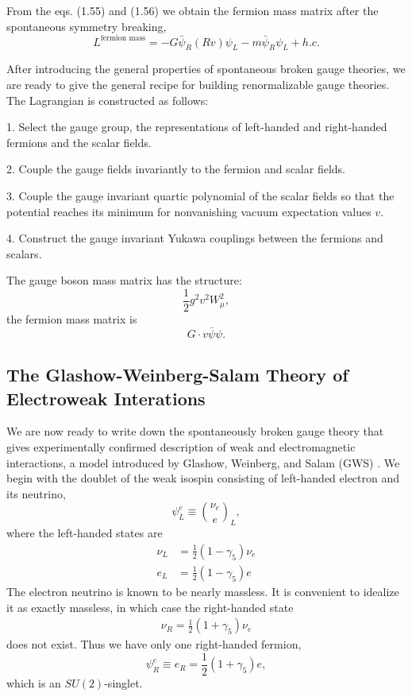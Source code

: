From the eqs. (1.55) and (1.56) we obtain the fermion mass matrix after the spontaneous symmetry breaking,
\begin{equation}
L^{\text{fermion mass}}=-G\bar{\psi}_R(Rv)\psi_L-m\bar{\psi}_R\psi_L+h.c.
\end{equation}

After introducing the general properties of spontaneous broken gauge theories, we are ready to give the general recipe for building renormalizable gauge theories. The Lagrangian is constructed as follows:

1. Select the gauge group, the representations of left-handed and right-handed fermions and the scalar fields.

2. Couple the gauge fields invariantly to the fermion and scalar fields.

3. Couple the gauge invariant quartic polynomial of the scalar fields so that the potential reaches its minimum for nonvanishing vacuum expectation values $v$.

4. Construct the gauge invariant Yukawa couplings between the fermions and scalars.

The gauge boson mass matrix has the structure: 
$$
\frac{1}{2}g^2v^2W_\mu^2,
$$
the fermion mass matrix is
$$
G\cdot v\bar{\psi}\psi.
$$

\subsection{The Glashow-Weinberg-Salam Theory of Electroweak Interations}
We are now ready to write down the spontaneously broken gauge theory that gives experimentally confirmed description of weak and electromagnetic interactions, a model introduced by Glashow, Weinberg, and Salam (GWS) \cite{Glashow1961,Weinberg,Salam}. We begin with the doublet of the weak isospin consisting of left-handed electron and its neutrino,
\begin{equation}
\psi_{L}^e \equiv \binom{\nu_e}{e}_L,
\end{equation}
where the left-handed states are
\begin{align}
\nu_L&=\frac{1}{2}(1-\gamma_5)\nu_e\nonumber\\
e_L&=\frac{1}{2}(1-\gamma_5)e
\end{align}
The electron neutrino is known to be nearly massless. It is convenient to idealize it as exactly massless, in which case the right-handed state 
\begin{eqnarray}
\nu_R = \frac{1}{2}(1+\gamma_5)\nu_e
\end{eqnarray}
does not exist. Thus we have only one right-handed fermion,
\begin{equation}
\psi_R^e \equiv e_R =\frac{1}{2}(1+\gamma_5)e,
\end{equation}
which is an $SU(2)$-singlet.

